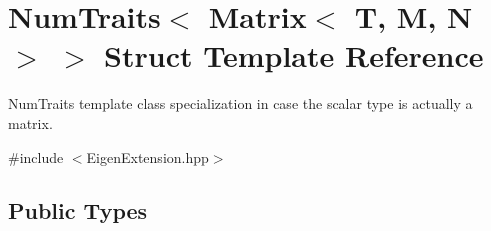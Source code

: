 \hypertarget{struct_eigen_1_1_num_traits_3_01_matrix_3_01_t_00_01_m_00_01_n_01_4_01_4}{\section{Num\-Traits$<$ Matrix$<$ T, M, N $>$ $>$ Struct Template Reference}
\label{struct_eigen_1_1_num_traits_3_01_matrix_3_01_t_00_01_m_00_01_n_01_4_01_4}
}


Num\-Traits template class specialization in case the scalar type is actually a matrix.  




{\ttfamily \#include $<$Eigen\-Extension.\-hpp$>$}

\subsection*{Public Types}
